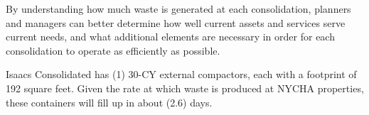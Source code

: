 
    By understanding how much waste is generated at each consolidation, planners and managers
    can better determine how well current assets and services serve current needs, and what additional 
    elements are necessary in order for each consolidation to operate as efficiently as possible. 

    Isaacs Consolidated has (1) 30-CY external compactors, each with a footprint of 192 square feet. Given the rate at which waste is produced at NYCHA properties, these containers will fill
    up in about (2.6) days.